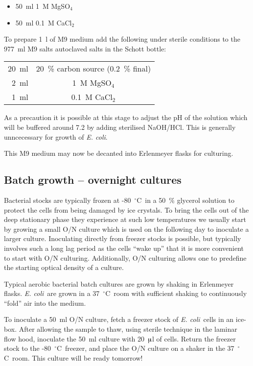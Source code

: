 \documentclass[a4paper]{article}
\newcommand{\dc}{~$^{\circ}$C}
\newcommand{\ec}{\textit{E. coli}}
\newcommand{\micro}{$\muup$}
\begin{document}
\begin{multicols}{2}
\begin{itemize}
\item 50~ml 1~M MgSO$_4$
\item 50~ml 0.1~M CaCl$_2$
\end{itemize}

To prepare 1~l of M9 medium add the following under sterile conditions to the
977~ml M9 salts autoclaved salts in the Schott bottle:

\begin{center}
\begin{tabular}[h]{rc} \toprule
20~ml   & 20~\% carbon source (0.2~\% final)\\
2~ml    & 1~M MgSO$_4$\\
1~ml    & 0.1~M CaCl$_2$\\ \bottomrule
\end{tabular}
\end{center}

As a precaution it is possible at this stage to adjust the pH of the solution
which will be buffered around 7.2 by adding sterilised NaOH/HCl. This is
generally unncecessary for growth of \ec.

This M9 medium may now be decanted into Erlenmeyer flasks for culturing.


\subsection{Batch growth -- overnight cultures} 

Bacterial stocks are typically frozen at -80\dc\ in a 50~\% glycerol solution
to protect the cells from being damaged by ice crystals. To bring the cells out
of the deep stationary phase they experience at such low temperatures we
usually start by growing a small O/N culture which is used on the following day
to inoculate a larger culture. Inoculating directly from freezer stocks is
possible, but typically involves such a long lag period as the cells ``wake
up'' that it is more convenient to start with O/N culturing. Additionally, O/N
culturing allows one to predefine the starting optical density of a culture.

Typical aerobic bacterial batch cultures are grown by
shaking in Erlenmeyer flasks. \ec\ are grown in a 37\dc\ room with sufficient
shaking to continuously ``fold'' air into the medium.

To inoculate a 50~ml O/N culture, fetch a freezer stock of \ec\ cells in an
ice-box. After allowing the sample to thaw, using sterile technique in the
laminar flow hood, inoculate the 50~ml culture with 20~\micro l of cells.
Return the freezer stock to the -80\dc\ freezer, and place the O/N culture on a
shaker in the 37\dc\ room. This culture will be ready tomorrow!


\end{multicols}
\end{document}
